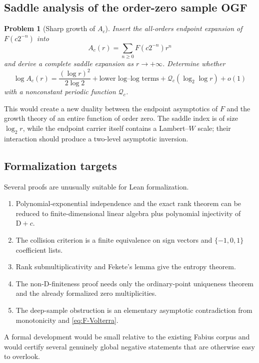 \documentclass[11pt]{article}
\numberwithin{equation}{section}
\newtheorem{problem}[theorem]{Problem}
\theoremstyle{definition}
\theoremstyle{remark}
\newcommand{\D}{\mathrm D}
\begin{document}
\subsection{Saddle analysis of the order-zero sample OGF}

\begin{problem}[Sharp growth of $A_c$]
\label{problem:sample-OGF-asymptotic}
Insert the all-orders endpoint expansion of $F(c2^{-n})$ into
\begin{equation}
 A_c(r)=\sum_{n\ge0}F(c2^{-n})r^n
 \label{eq:Ac-saddle-sum}
\end{equation}
and derive a complete saddle expansion as $r\to+\infty$.  Determine whether
\begin{equation}
 \log A_c(r)=\frac{(\log r)^2}{2\log2}
 +\text{lower log--log terms}
 +\mathcal Q_c(\log_2\log r)+o(1)
 \label{eq:Ac-conjectural-growth}
\end{equation}
with a nonconstant periodic function $\mathcal Q_c$.
\end{problem}

This would create a new duality between the endpoint asymptotics of $F$ and the
growth theory of an entire function of order zero.  The saddle index is of
size $\log_2 r$, while the endpoint carrier itself contains a Lambert--$W$
scale; their interaction should produce a two-level asymptotic inversion.

\subsection{Formalization targets}

Several proofs are unusually suitable for Lean formalization.
\begin{enumerate}
 \item Polynomial-exponential independence and the exact rank theorem can be
       reduced to finite-dimensional linear algebra plus polynomial
       injectivity of $\D+c$.
 \item The collision criterion is a finite equivalence on sign vectors and
       $\{-1,0,1\}$ coefficient lists.
 \item Rank submultiplicativity and Fekete's lemma give the entropy theorem.
 \item The non-D-finiteness proof needs only the ordinary-point uniqueness
       theorem and the already formalized zero multiplicities.
 \item The deep-sample obstruction is an elementary asymptotic contradiction
       from monotonicity and \eqref{eq:F-Volterra}.
\end{enumerate}
A formal development would be small relative to the existing Fabius corpus and
would certify several genuinely global negative statements that are otherwise
easy to overlook.
\end{document}
